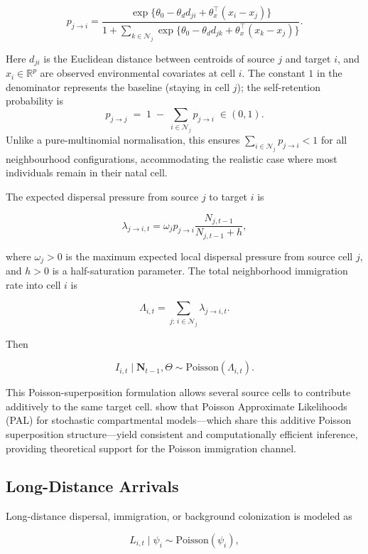 \documentclass[review,12pt]{elsarticle}
\theoremstyle{definition}
\begin{document}
\begin{equation}\label{eq:dispersal}
p_{j\to i}
=
\frac{\exp\{\theta_0-\theta_d d_{ji}
+\theta_x^\top(x_i-x_j)\}}
{1+\sum_{k\in\mathcal{N}_j}
\exp\{\theta_0-\theta_d d_{jk}
+\theta_x^\top(x_k-x_j)\}}.
\end{equation}

Here \(d_{ji}\) is the Euclidean distance between centroids of source \(j\)
and target \(i\), and \(x_i\in\mathbb{R}^p\) are observed environmental
covariates at cell \(i\).
The constant \(1\) in the denominator represents the baseline
(staying in cell \(j\)); the self-retention probability is
\[
  p_{j\to j} \;=\; 1 \;-\; \sum_{i\in\mathcal{N}_j} p_{j\to i} \;\in(0,1).
\]
Unlike a pure-multinomial normalisation, this ensures
\(\sum_{i\in\mathcal{N}_j} p_{j\to i} < 1\) for all neighbourhood
configurations, accommodating the realistic case where most individuals
remain in their natal cell.

The expected dispersal pressure from source \(j\) to target \(i\) is

\[
\lambda_{j\to i,t}
=
\omega_j p_{j\to i}
\frac{N_{j,t-1}}{N_{j,t-1}+h},
\]

where \(\omega_j>0\) is the maximum expected local dispersal pressure from source
cell \(j\), and \(h>0\) is a half-saturation parameter. The total neighborhood
immigration rate into cell \(i\) is

\[
\Lambda_{i,t}
=
\sum_{j:\, i\in\mathcal{N}_j}
\lambda_{j\to i,t}.
\]

Then

\[
I_{i,t}\mid \bm N_{t-1},\Theta
\sim
\mathrm{Poisson}(\Lambda_{i,t}).
\]

This Poisson-superposition formulation allows several source cells to contribute
additively to the same target cell.
\citet{whitehouse2023} show that Poisson Approximate Likelihoods (PAL) for
stochastic compartmental models---which share this additive Poisson
superposition structure---yield consistent and computationally efficient
inference, providing theoretical support for the Poisson immigration channel.

\subsection{Long-Distance Arrivals}

Long-distance dispersal, immigration, or background colonization is modeled as

\[
L_{i,t}\mid \psi_i\sim \mathrm{Poisson}(\psi_i),
\]
\end{document}
